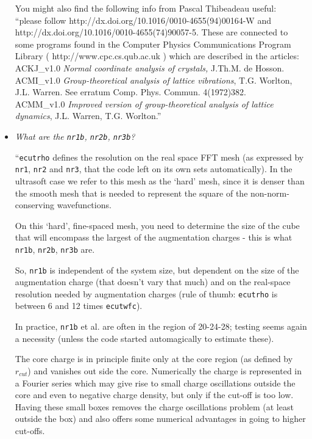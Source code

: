 \documentclass[12pt,a4paper]{article}
\begin{document}
\begin{itemize}
You might also find the following info from Pascal Thibeadeau useful:\\
``please follow 
%
                          {http://dx.doi.org/10.1016/0010-4655(94)00164-W}
and
%
                          {http://dx.doi.org/10.1016/0010-4655(74)90057-5}. 
These are connected to some programs found in the Computer Physics 
Communications Program Library 
(%
                           {http://www.cpc.cs.qub.ac.uk} ) 
which are described in the articles:\\
ACKJ\_v1.0 {\em Normal coordinate analysis of crystals,}
J.Th.M. de Hosson.\\
ACMI\_v1.0 {\em Group-theoretical analysis of lattice vibrations},
T.G. Worlton, J.L. Warren. See erratum Comp. Phys. Commun. 4(1972)382.\\
ACMM\_v1.0 {\em Improved version of group-theoretical analysis of lattice 
dynamics}, J.L. Warren, T.G. Worlton.''

\item {\em What are the \texttt{nr1b}, \texttt{nr2b}, \texttt{nr3b}?}

``\texttt{ecutrho} defines the resolution on the real space FFT mesh 
(as expressed by \texttt{nr1}, \texttt{nr2} and \texttt{nr3}, that
the code left on its own sets automatically). In the ultrasoft
case we refer to this mesh as the `hard' mesh, since
it is denser than the smooth mesh that is needed to
represent the square of the non-norm-conserving wavefunctions.

On this `hard', fine-spaced mesh, you need to determine the size
of the cube that will encompass the largest of the augmentation
charges - this is what \texttt{nr1b}, \texttt{nr2b}, \texttt{nr3b} are.

So, \texttt{nr1b} is independent of the system size, but dependent on the
size of the augmentation charge (that doesn't vary that much)
and on the real-space resolution needed by augmentation charges
(rule of thumb: \texttt{ecutrho} is between 6 and 12 times \texttt{ecutwfc}).

In practice, \texttt{nr1b} et al. are often in the region of 20-24-28;
testing seems again a necessity (unless the code started
automagically to estimate these).

The core charge is in principle finite only at the core region (as 
defined by $r_{cut}$) and vanishes out side the core. Numerically the charge 
is represented in a Fourier series which may give rise to small charge 
oscillations outside the core and even to negative charge density, but 
only if the cut-off is too low. Having these small boxes removes the 
charge oscillations problem (at least outside the box) and also offers 
some numerical advantages in going to higher cut-offs.


\end{itemize}
\end{document}
